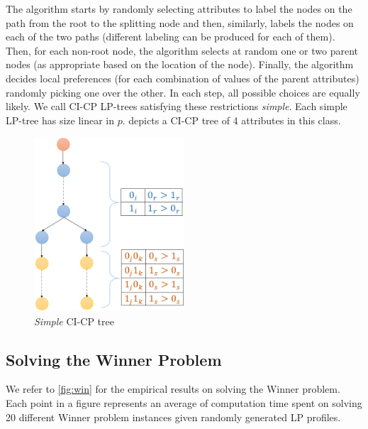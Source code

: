 The algorithm starts by randomly selecting attributes to label the nodes on 
the path from the root to the splitting node and then, similarly, labels 
the nodes on each of the two paths (different labeling can be produced
for each of them). Then, for each non-root node, the algorithm selects at random
one or two parent nodes (as appropriate based on the location of the node).
Finally, the algorithm decides 
local preferences (for each combination of values of the parent attributes)
randomly picking one over the other. In each step, all 
possible choices are equally likely. We call CI-CP LP-trees satisfying 
these restrictions \emph{simple}. Each simple LP-tree has size 
linear in $p$.   depicts a CI-CP tree of 
4 attributes in this class. 
\begin{figure}
\centering
	\includegraphics[width=0.5\textwidth]{img/simple_LP_tree.png}
\caption{\emph{Simple} CI-CP tree}
\label{fig:MSCICP_tree}
\end{figure}



\subsection{Solving the Winner Problem}

We refer to \ref{fig:win} for the empirical results on solving the Winner problem.  
Each point in a figure represents
an average of computation time spent on solving 20 different 
Winner problem instances given randomly
generated LP profiles.

